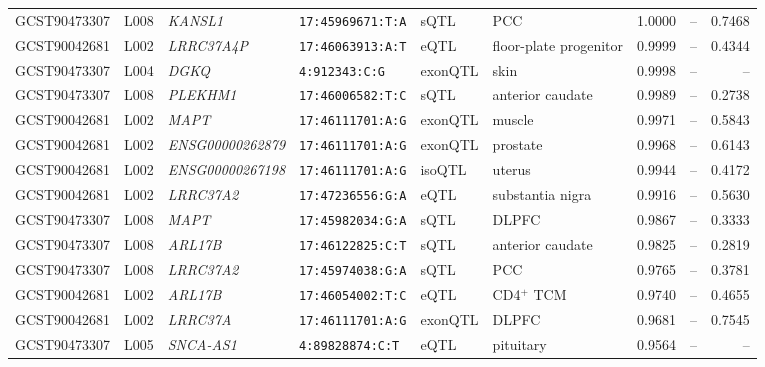 \documentclass[11pt,a4paper]{article}
\begin{document}
\begin{landscape}
\begin{longtable}{@{}lllp{2.9cm}lp{3.1cm}rrr@{}}
GCST90473307 & L008 & \textit{KANSL1} &
\texttt{17:45969671:T:A} &
sQTL & PCC &
1.0000 & -- & 0.7468 \\

GCST90042681 & L002 & \textit{LRRC37A4P} &
\texttt{17:46063913:A:T} &
eQTL & floor-plate progenitor &
0.9999 & -- & 0.4344 \\

GCST90473307 & L004 & \textit{DGKQ} &
\texttt{4:912343:C:G} &
exonQTL & skin &
0.9998 & -- & -- \\

GCST90473307 & L008 & \textit{PLEKHM1} &
\texttt{17:46006582:T:C} &
sQTL & anterior caudate &
0.9989 & -- & 0.2738 \\

GCST90042681 & L002 & \textit{MAPT} &
\texttt{17:46111701:A:G} &
exonQTL & muscle &
0.9971 & -- & 0.5843 \\

GCST90042681 & L002 &
\textit{ENSG00000262879} &
\texttt{17:46111701:A:G} &
exonQTL & prostate &
0.9968 & -- & 0.6143 \\

GCST90042681 & L002 &
\textit{ENSG00000267198} &
\texttt{17:46111701:A:G} &
isoQTL & uterus &
0.9944 & -- & 0.4172 \\

GCST90042681 & L002 & \textit{LRRC37A2} &
\texttt{17:47236556:G:A} &
eQTL & substantia nigra &
0.9916 & -- & 0.5630 \\

GCST90473307 & L008 & \textit{MAPT} &
\texttt{17:45982034:G:A} &
sQTL & DLPFC &
0.9867 & -- & 0.3333 \\

GCST90473307 & L008 & \textit{ARL17B} &
\texttt{17:46122825:C:T} &
sQTL & anterior caudate &
0.9825 & -- & 0.2819 \\

GCST90473307 & L008 & \textit{LRRC37A2} &
\texttt{17:45974038:G:A} &
sQTL & PCC &
0.9765 & -- & 0.3781 \\

GCST90042681 & L002 & \textit{ARL17B} &
\texttt{17:46054002:T:C} &
eQTL & CD4$^{+}$ TCM &
0.9740 & -- & 0.4655 \\

GCST90042681 & L002 & \textit{LRRC37A} &
\texttt{17:46111701:A:G} &
exonQTL & DLPFC &
0.9681 & -- & 0.7545 \\

GCST90473307 & L005 & \textit{SNCA-AS1} &
\texttt{4:89828874:C:T} &
eQTL & pituitary &
0.9564 & -- & -- \\


\end{longtable}
\end{landscape}
\end{document}
